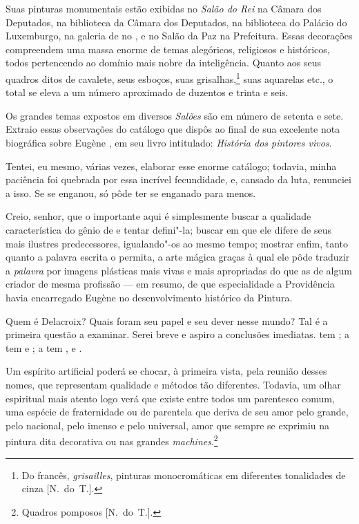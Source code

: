 Suas pinturas monumentais estão exibidas no \textit{Salão do Rei} na
Câmara dos Deputados, na biblioteca da Câmara dos Deputados, na
biblioteca do Palácio do Luxemburgo, na galeria de  no , e	
no Salão da Paz na Prefeitura. Essas decorações compreendem uma massa
enorme de temas alegóricos, religiosos e históricos, todos pertencendo
ao domínio mais nobre da inteligência. Quanto aos seus quadros ditos de
cavalete, seus esboços, suas grisalhas,\footnote{ Do francês,
\textit{grisailles}, pinturas monocromáticas em diferentes tonalidades
de cinza [N.~do~T.].} suas aquarelas etc., o total se eleva a um
número aproximado de duzentos e trinta e seis.

Os grandes temas expostos em diversos \textit{Salões} são em número de
setenta e sete. Extraio essas observações do catálogo que  dispôs ao final de sua excelente nota biográfica sobre Eugène
, em seu livro intitulado: \textit{História dos pintores
vivos}.

Tentei, eu mesmo, várias vezes, elaborar esse enorme catálogo; todavia,
minha paciência foi quebrada por essa incrível fecundidade, e, cansado da
luta, renunciei a isso. Se  se enganou, só pôde ter
se enganado para menos.

Creio, senhor, que o importante aqui é simplesmente buscar a qualidade
característica do gênio de  e tentar defini"-la; buscar em que
ele difere de seus mais ilustres predecessores, igualando"-os ao mesmo
tempo; mostrar enfim, tanto quanto a palavra escrita o permita, a arte
mágica graças à qual ele pôde traduzir a \textit{palavra} por imagens
plásticas mais vivas e mais apropriadas do que as de algum criador de
mesma profissão --- em resumo, de que especialidade a Providência havia
encarregado Eugène  no desenvolvimento histórico da Pintura.

\sectionitem

Quem é Delacroix? Quais foram seu papel e seu dever nesse mundo? Tal é a
primeira questão a examinar. Serei breve e aspiro a conclusões
imediatas.  tem ; a  tem  e ; a
 tem ,  e .

Um espírito artificial poderá se chocar, à primeira vista, pela reunião
desses nomes, que representam qualidade e métodos tão diferentes.
Todavia, um olhar espiritual mais atento logo verá que existe entre
todos um parentesco comum, uma espécie de fraternidade ou de parentela
que deriva de seu amor pelo grande, pelo nacional, pelo imenso e pelo
universal, amor que sempre se exprimiu na pintura dita decorativa ou
nas grandes \textit{machines}.\footnote{ Quadros pomposos [N.~do~T.].}

